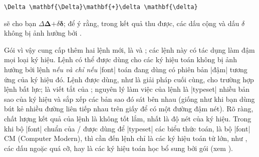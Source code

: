 \documentclass[11pt,leqno,titlepage,openany]{amsldoc}[1999/12/13]
\begin{document}
\medskip
\begin{verbatim}
\Delta \mathbf{\Delta}\mathbf{+}\delta \mathbf{\delta}
\end{verbatim}

\medskip\noindent
sẽ cho bạn $\Delta \mathbf{\Delta}\mathbf{+}\delta \mathbf{\delta}$;
để ý rằng, trong kết quả thu được, các dấu cộng và dấu $\delta$ không
bị ảnh hưởng bởi .

\medskip
Gói  vì vậy cung cấp thêm hai lệnh mới, là
 và ; các lệnh này có tác dụng làm đậm mọi loại
ký hiệu. Lệnh  có thể được dùng cho các ký hiệu toán không
bị ảnh hưởng bởi lệnh  \emph{nếu và chỉ nếu} |font| toán
đang dùng có phiên bản |đậm| tương ứng của ký hiệu đó. Lệnh 
được dùng, như là giải pháp cuối cùng, cho trường hợp lệnh 
bất lực;  là viết tắt của ;
nguyên lý làm việc của lệnh  là |typeset| nhiều bản sao của
ký hiệu và sắp xếp các bản sao đó sát bên nhau (giống như khi bạn
dùng bút kẻ nhiều đường liên tiếp nhau trên giấy để có một đường đậm nét).
Rõ ràng, chất lượng kết quả của lệnh  là không tốt lắm, nhất là
độ nét của ký hiệu. Trong khi bộ |font| chuẩn của \latex/ được dùng để
|typeset| các biểu thức toán, là bộ |font| CM (Computer Modern), thì cần đến
lệnh  chỉ là các ký hiệu toán tử lớn, như ,
các dấu ngoặc quá cỡ, hay là các ký hiệu toán học bổ sung bởi gói
 (xem \cite{amsfonts}).
\end{document}
